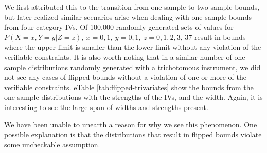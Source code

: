 \documentclass[
]{article}
\theoremstyle{plain}
\begin{document}
We first attributed this to the transition from one-sample to two-sample bounds, but later realized similar scenarios arise when dealing with one-sample bounds from four category IVs. Of 100,000 randomly generated sets of values for \(P(X = x, Y = y | Z = z),\ x=0,1,\ y=0,1,\ z=0,1,2,3\), 37 result in bounds where the upper limit is smaller than the lower limit without any violation of the verifiable constraints. It is also worth noting that in a similar number of one-sample distributions randomly generated with a trichotomous instrument, we did not see any cases of flipped bounds without a violation of one or more of the verifiable constraints. eTable \ref{tab:flipped-trivariates} show the bounds from the one-sample distributions with the strengths of the IVs, and the width. Again, it is interesting to see the large span of widths and strengths present.

We have been unable to unearth a reason for why we see this phenomenon. One possible explanation is that the distributions that result in flipped bounds violate some uncheckable assumption.

\begingroup\fontsize{9}{11}\selectfont
\end{document}
